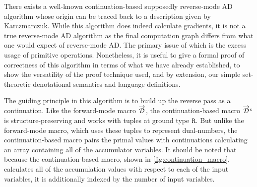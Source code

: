   There exists a well-known continuation-based supposedly reverse-mode AD algorithm whose origin can be traced back to a description given by Karczmarczuk\cite{KarczmarczukLazyTimeReversal}.
  While this algorithm does indeed calculate gradients, it is not a true reverse-mode AD algorithm as the final computation graph differs from what one would expect of reverse-mode AD\cite{PearlmutterSiskind2008}.
  The primary issue of which is the excess usage of primitive operations.
  Nonetheless, it is useful to give a formal proof of correctness of this algorithm in terms of what we have already established, to show the versatility of the proof technique used, and by extension, our simple set-theoretic denotational semantics and language definitions.

  The guiding principle in this algorithm is to build up the reverse pass as a continuation.
  Like the forward-mode macro $\overrightarrow{\mathcal{D}}$, the continuation-based macro $\overrightarrow{\mathcal{D}}^c$ is structure-preserving and works with tuples at ground type $\texttt{R}$.
  But unlike the forward-mode macro, which uses these tuples to represent dual-numbers, the continuation-based macro pairs the primal values with continuations calculating an array containing all of the accumulator variables.
  It should be noted that because the continuation-based macro, shown in \cref{fig:continuation_macro}, calculates all of the accumulation values with respect to each of the input variables, it is additionally indexed by the number of input variables.

